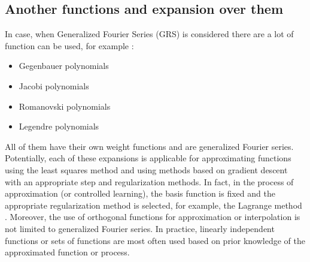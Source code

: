 \subsection{Another functions and expansion over them}
In case, when Generalized Fourier Series (GRS) is considered there are a lot of function can be used, for example \cite{abramowitz1965handbook}:
\begin{itemize}
	\item Gegenbauer polynomials
	\item Jacobi polynomials
	\item Romanovski polynomials
	\item Legendre polynomials
\end{itemize}

All of them have their own weight functions and are generalized Fourier series. Potentially, each of these expansions is applicable for approximating functions using the least squares method and using methods based on gradient descent with an appropriate step and regularization methods. In fact, in the process of approximation (or controlled learning), the basis function is fixed and the appropriate regularization method is selected, for example, the Lagrange method \cite{городецкий2007нелинейное}. Moreover, the use of orthogonal functions for approximation or interpolation is not limited to generalized Fourier series. In practice, linearly independent functions or sets of functions are most often used based on prior knowledge of the approximated function or process.